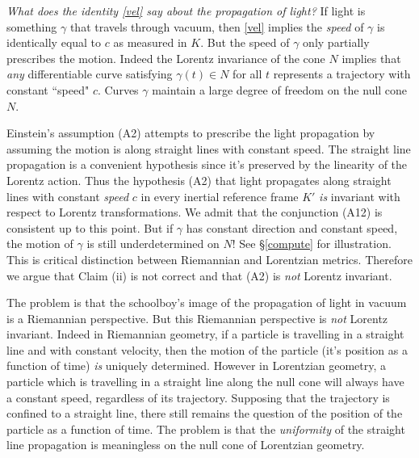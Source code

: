 \documentclass[12pt]{article}
\begin{document}


\emph{What does the identity \eqref{vel} say about the propagation of light?} If light is something $\gamma$ that travels through vacuum, then \eqref{vel} implies the \emph{speed} of $\gamma$ is identically equal to $c$ as measured in $K$. But the speed of $\gamma$ only partially prescribes the motion. Indeed the Lorentz invariance of the cone $N$ implies that \emph{any} differentiable curve satisfying $\gamma(t) \in N$ for all $t$ represents a trajectory with constant ``speed" $c$. Curves $\gamma$ maintain a large degree of freedom on the null cone $N$.

Einstein's assumption (A2) attempts to prescribe the light propagation by assuming the motion is along straight lines with constant speed. The straight line propagation is a convenient hypothesis since it's preserved by the linearity of the Lorentz action. Thus the hypothesis (A2) that light propagates along straight lines with constant \emph{speed} $c$ in every inertial reference frame $K'$ \emph{is} invariant with respect to Lorentz transformations. We admit that the conjunction (A12) is consistent up to this point. But if $\gamma$ has constant direction and constant speed, the motion of $\gamma$ is still underdetermined on $N$! See \S \ref{compute} for illustration. This is critical distinction between Riemannian and Lorentzian metrics. Therefore we argue that Claim (ii) is not correct and that (A2) is \emph{not} Lorentz invariant.

The problem is that the schoolboy's image of the propagation of light in vacuum is a Riemannian perspective. But this Riemannian perspective is \emph{not} Lorentz invariant. Indeed in Riemannian geometry, if a particle is travelling in a straight line and with constant velocity, then the motion of the particle (it's position as a function of time) \emph{is} uniquely determined. However in Lorentzian geometry, a particle which is travelling in a straight line along the null cone will always have a constant speed, regardless of its trajectory. Supposing that the trajectory is confined to a straight line, there still remains the question of the position of the particle as a function of time. The problem is that the \emph{uniformity} of the straight line propagation is meaningless on the null cone of Lorentzian geometry. 
\end{document}
